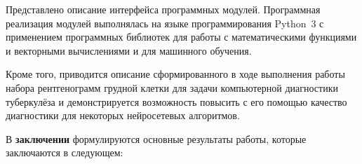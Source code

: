 Представлено описание интерфейса программных модулей. Программная реализация модулей выполнялась на языке программирования Python~3 с применением программных библиотек для работы с математическими функциями и векторными вычислениями и для машинного обучения.

Кроме того, приводится описание сформированного в ходе выполнения работы набора рентгенограмм грудной клетки для задачи компьютерной диагностики туберкулёза и демонстрируется возможность повысить с его помощью качество диагностики для некоторых нейросетевых алгоритмов.


\FloatBarrier
{}                                  %
В \textbf{заключении} формулируются основные результаты работы, которые заключаются в следующем:




